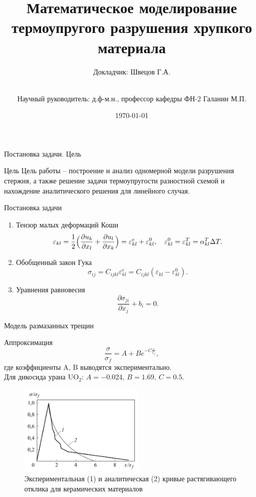 \documentclass{beamer}
\title[Моделирование термоупругого ...]{Математическое моделирование термоупругого разрушения хрупкого материала}
\author[Швецов Г.А.]{Докладчик: Швецов Г.А.\and\\[0.5mm] Научный руководитель: д.ф-м.н., профессор кафедры ФН-2 Галанин М.П.}
\institute[каф. Прикладная математика ФН-2]{группа ФН2-52Б}
\date{\today}
\begin{document}
		\newcommand{\pl}{\partial}
	\begin{frame}
		\titlepage
	\end{frame}
			
	\begin{frame}{Постановка задачи. Цель}
		\begin{block}{Цель}
			Цель работы -- построение и анализ одномерной модели разрушения стержня, а также решение задачи термоупругости разностной схемой и нахождение аналитического решения для линейного случая.
		\end{block}
		\begin{block}{Постановка задачи}
			\footnotesize
			\begin{enumerate}
				\item Тензор малых деформаций Коши
				\[
				\varepsilon_{kl} = \dfrac{1}{2}\Bigl( \dfrac{\partial u_k}{\partial x_l} + \dfrac{\partial u_l}{\partial x_k} \Bigr) = \varepsilon_{kl}^e +  \varepsilon_{kl}^0, \quad \varepsilon_{kl}^0 = \varepsilon_{kl}^T=\alpha_{kl}^T \Delta T.
				\]
				\item Обобщенный закон Гука
				\[
				\sigma_{ij} = C_{ijkl} \varepsilon_{kl}^e = C_{ijkl}(\varepsilon_{kl} - \varepsilon_{kl}^0).
				\]
				\item Уравнения равновесия
				\[
				\dfrac{\partial \sigma_{ji}}{\partial x_j} + b_i = 0.
				\]
			\end{enumerate}
		\end{block}
	\end{frame}
	
	\begin{frame}{Модель размазанных трещин}
	\begin{block}{Аппроксимация}
	\begin{equation}
	\dfrac{\sigma}{\sigma_f} = A + B e^{-C \tfrac{\varepsilon}{\varepsilon_f}},	
	\end{equation}
	где коэффициенты A, B выводятся экспериментально.\\ Для дикосида урана UO$_2$:
	$
	A = -0.024,\, B = 1.69, \, C = 0.5.  
	$
	\end{block}
	\begin{figure}[h]
	\centering
	\includegraphics[width=0.53\textwidth]{ceramic}
		\caption{\small{Экспериментальная (1) и аналитическая (2) кривые растягивающего отклика для керамических материалов}}
	\label{fig:ceramic}
\end{figure}
	\end{frame}
	
\end{document}
